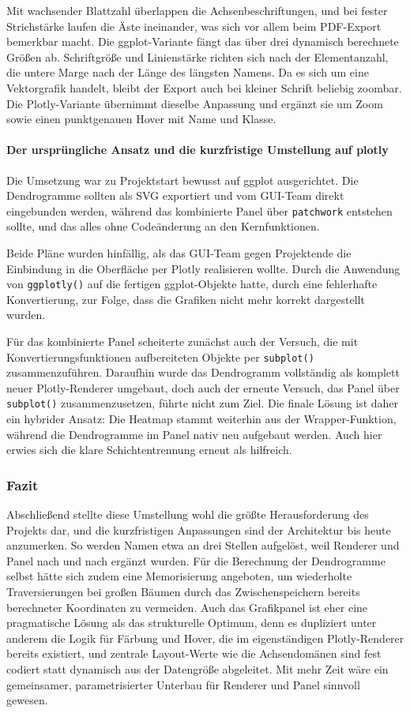 \documentclass[12pt]{article}
\newcommand{\code}[1]{\texttt{#1}}
\begin{document}
Mit wachsender Blattzahl überlappen die Achsenbeschriftungen, und bei fester 
Strichstärke laufen die Äste ineinander, was sich vor allem beim PDF-Export 
bemerkbar macht. Die ggplot-Variante fängt das über drei dynamisch berechnete 
Größen ab. Schriftgröße und Linienstärke richten sich nach der Elementanzahl, die 
untere Marge nach der Länge des längsten Namens. Da es sich um eine Vektorgrafik 
handelt, bleibt der Export auch bei kleiner Schrift beliebig zoombar. Die 
Plotly-Variante übernimmt dieselbe Anpassung und ergänzt sie um Zoom sowie einen 
punktgenauen Hover mit Name und Klasse. 
\paragraph{Der ursprüngliche Ansatz und die kurzfristige Umstellung auf plotly}

Die Umsetzung war zu Projektstart bewusst auf ggplot ausgerichtet. Die Dendrogramme 
sollten als SVG exportiert und vom GUI-Team direkt eingebunden werden, während das 
kombinierte Panel über \code{patchwork} entstehen sollte, und das alles ohne 
Codeänderung an den Kernfunktionen.

Beide Pläne wurden hinfällig, als das GUI-Team gegen Projektende die Einbindung in 
die Oberfläche per Plotly realisieren wollte. Durch die Anwendung  von \code{ggplotly()} auf die fertigen 
ggplot-Objekte
hatte, durch eine fehlerhafte Konvertierung, zur Folge, dass die Grafiken nicht mehr korrekt 
dargestellt wurden.

Für das kombinierte Panel scheiterte zunächst auch der Versuch, die mit 
Konvertierungsfunktionen aufbereiteten Objekte per \code{subplot()} zusammenzuführen. 
Daraufhin wurde das Dendrogramm vollständig als komplett neuer Plotly-Renderer 
umgebaut, doch auch der erneute Versuch, das Panel über \code{subplot()} 
zusammenzusetzen, führte nicht zum Ziel. Die finale Lösung ist daher ein hybrider 
Ansatz: Die Heatmap stammt weiterhin aus der Wrapper-Funktion, während die 
Dendrogramme im Panel nativ neu aufgebaut werden. Auch hier erwies sich die klare 
Schichtentrennung erneut als hilfreich.

\subsubsection{Fazit}

Abschließend stellte diese Umstellung wohl die größte Herausforderung des Projekts 
dar, und die kurzfristigen Anpassungen sind der Architektur bis heute anzumerken. So 
werden Namen etwa an drei Stellen aufgelöst, weil Renderer 
und Panel nach und nach ergänzt wurden. Für die Berechnung der Dendrogramme selbst hätte sich 
zudem eine Memorisierung angeboten, um wiederholte Traversierungen bei großen Bäumen 
durch das Zwischenspeichern bereits berechneter Koordinaten zu vermeiden. Auch das 
Grafikpanel ist eher eine pragmatische Lösung als das strukturelle Optimum, denn es 
dupliziert unter anderem die Logik für Färbung und Hover, die im eigenständigen 
Plotly-Renderer bereits existiert, und zentrale Layout-Werte wie die Achsendomänen 
sind fest codiert statt dynamisch aus der Datengröße abgeleitet. Mit mehr Zeit wäre 
ein gemeinsamer, parametrisierter Unterbau für Renderer und Panel sinnvoll gewesen.
\end{document}
